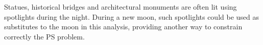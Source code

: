 Statues, historical bridges and architectural monuments are often lit using spotlights during the night. During a new moon, such spotlights could be used as substitutes to the moon in this analysis, providing another way to constrain correctly the PS problem.













